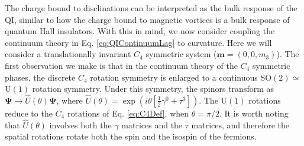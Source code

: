 \documentclass[%
 reprint,
 amsmath,amssymb,
 aps,
]{revtex4-1}
\begin{document}
The charge bound to disclinations can be interpreted as the bulk response of the QI, similar to how the charge bound to magnetic vortices is a bulk response of quantum Hall insulators. 
With this in mind, we now consider coupling the continuum theory in Eq. \ref{eq:QIContinuumLag} to curvature. Here we will consider a translationally invariant $C_4$ symmetric system ($\bm{m} = (0,0,m_3)$). The first observation we make is that in the continuum theory of the $C_4$ symmetric phases, the discrete $C_4$ rotation symmetry is enlarged to a continuous SO$(2)\simeq$U$(1)$ rotation symmetry. Under this symmetry, the spinors transform as $\bm{\Psi}\rightarrow \hat{U}(\theta) \bm{\Psi}$, where $\hat{U}(\theta) = \exp(i \theta [\frac{1}{2}\gamma^0 + \tau^3])$. The U$(1)$ rotations reduce to the $C_4$ rotations of Eq. \ref{eq:C4Def}, when $\theta = \pi/2$. It is worth noting that $\hat{U}(\theta)$ involves both the $\gamma$ matrices and the $\tau$ matrices, and therefore the spatial rotations rotate both the spin and the isospin of the fermions. 
\end{document}
